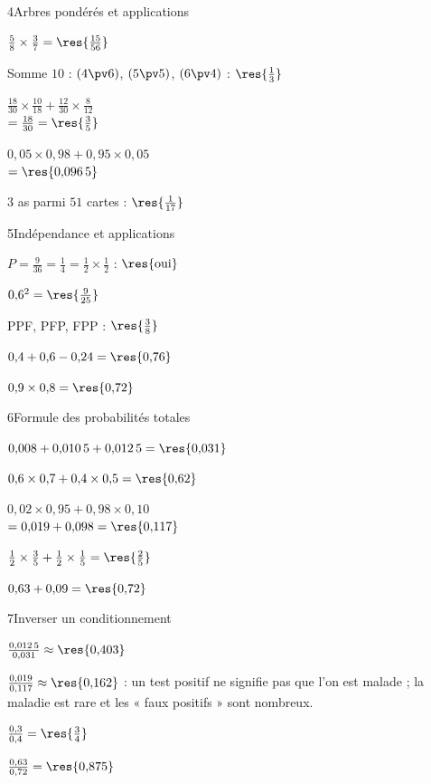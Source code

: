 \begin{deuxcolonnes}
\begin{corrige}{4}{Arbres pondérés et applications}
\begin{questions}
  \item $\frac58\times\frac37=\res{\frac{15}{56}}$
  \item Somme $10$ : $(4\pv6)$, $(5\pv5)$, $(6\pv4)$ : $\res{\frac13}$
  \item $\frac{18}{30}\times\frac{10}{18}+\frac{12}{30}\times\frac{8}{12}$\\ $=\frac{18}{30}=\res{\frac35}$
  \item $0{,}05\times0{,}98+0{,}95\times0{,}05$\\ $=\res{0{,}096\,5}$
  \item $3$ as parmi $51$ cartes : $\res{\frac{1}{17}}$
\end{questions}
\end{corrige}

\begin{corrige}{5}{Indépendance et applications}
\begin{questions}
  \item $P=\frac{9}{36}=\frac14=\frac12\times\frac12$ : $\res{\text{oui}}$
  \item $0{,}6^{2}=\res{\frac{9}{25}}$
  \item PPF, PFP, FPP : $\res{\frac38}$
  \item $0{,}4+0{,}6-0{,}24=\res{0{,}76}$
  \item $0{,}9\times0{,}8=\res{0{,}72}$
\end{questions}
\end{corrige}

\begin{corrige}{6}{Formule des probabilités totales}
\begin{questions}
  \item $0{,}008+0{,}010\,5+0{,}012\,5=\res{0{,}031}$
  \item $0{,}6\times0{,}7+0{,}4\times0{,}5=\res{0{,}62}$
  \item $0{,}02\times0{,}95+0{,}98\times0{,}10$\\ $=0{,}019+0{,}098=\res{0{,}117}$
  \item $\frac12\times\frac35+\frac12\times\frac15=\res{\frac25}$
  \item $0{,}63+0{,}09=\res{0{,}72}$
\end{questions}
\end{corrige}

\begin{corrige}{7}{Inverser un conditionnement}
\begin{questions}
  \item $\frac{0{,}012\,5}{0{,}031}\approx\res{0{,}403}$
  \item $\frac{0{,}019}{0{,}117}\approx\res{0{,}162}$ : un test positif ne signifie pas que l'on est malade ; la maladie est rare
    et les « faux positifs » sont nombreux.
  \item $\frac{0{,}3}{0{,}4}=\res{\frac34}$
  \item $\frac{0{,}63}{0{,}72}=\res{0{,}875}$
\end{questions}
\end{corrige}


\end{deuxcolonnes}
